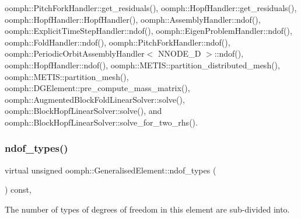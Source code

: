 oomph\+::\+Pitch\+Fork\+Handler\+::get\+\_\+residuals(), oomph\+::\+Hopf\+Handler\+::get\+\_\+residuals(), oomph\+::\+Hopf\+Handler\+::\+Hopf\+Handler(), oomph\+::\+Assembly\+Handler\+::ndof(), oomph\+::\+Explicit\+Time\+Step\+Handler\+::ndof(), oomph\+::\+Eigen\+Problem\+Handler\+::ndof(), oomph\+::\+Fold\+Handler\+::ndof(), oomph\+::\+Pitch\+Fork\+Handler\+::ndof(), oomph\+::\+Periodic\+Orbit\+Assembly\+Handler$<$ N\+N\+O\+D\+E\+\_\+D $>$\+::ndof(), oomph\+::\+Hopf\+Handler\+::ndof(), oomph\+::\+M\+E\+T\+I\+S\+::partition\+\_\+distributed\+\_\+mesh(), oomph\+::\+M\+E\+T\+I\+S\+::partition\+\_\+mesh(), oomph\+::\+D\+G\+Element\+::pre\+\_\+compute\+\_\+mass\+\_\+matrix(), oomph\+::\+Augmented\+Block\+Fold\+Linear\+Solver\+::solve(), oomph\+::\+Block\+Hopf\+Linear\+Solver\+::solve(), and oomph\+::\+Block\+Hopf\+Linear\+Solver\+::solve\+\_\+for\+\_\+two\+\_\+rhs().

\mbox{\label{classoomph_1_1GeneralisedElement_a0c6037a870597b35dcf1c780710b9a56}} 
\subsubsection{\texorpdfstring{ndof\+\_\+types()}{ndof\_types()}}
{\footnotesize\ttfamily virtual unsigned oomph\+::\+Generalised\+Element\+::ndof\+\_\+types (\begin{DoxyParamCaption}{ }\end{DoxyParamCaption}) const\hspace{0.3cm}{\ttfamily [inline]}, {\ttfamily [virtual]}}



The number of types of degrees of freedom in this element are sub-\/divided into. 



